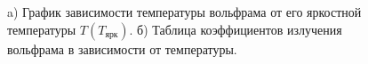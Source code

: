 \documentclass[a4paper, 14pt]{extarticle}%
\newcommand\ECaption[1]{%
     \captionsetup{font=footnotesize}%
     \caption{#1}}
\begin{document}
\begin{figure}[h!]
\begin{minipage}[h]{0.5\linewidth}
\end{minipage}
\hfill
\begin{minipage}[h]{0.5\linewidth}
\end{minipage}
\ECaption{a) График зависимости температуры вольфрама от его яркостной температуры $T(T_{\text{ярк}})$. б) Таблица коэффициентов излучения вольфрама в зависимости от температуры.}
\end{figure}
\end{document}
